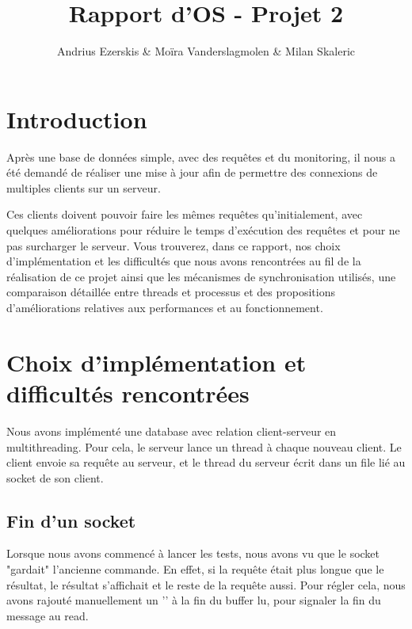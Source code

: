 \documentclass[utf8]{article}
\begin{document}
\begin{titlepage}


\author{Andrius Ezerskis \& Moïra Vanderslagmolen \& Milan Skaleric}
\title{Rapport d'OS - Projet 2}

\maketitle
\end{titlepage}
\begin{large}

\section{Introduction}
\par
\indent

Après une base de données simple, avec des requêtes et du monitoring, il nous a
été demandé de réaliser une mise à jour afin de permettre des connexions de
multiples clients sur un serveur.

\par
\par

Ces clients doivent pouvoir faire les mêmes requêtes qu'initialement, avec
quelques améliorations pour réduire le temps d'exécution des requêtes et pour ne
pas surcharger le serveur. Vous trouverez, dans ce rapport, nos choix
d'implémentation et les difficultés que nous avons rencontrées au fil de la
réalisation de ce projet ainsi que les mécanismes de synchronisation utilisés,
une comparaison détaillée entre threads et processus et des propositions
d'améliorations relatives aux performances et au fonctionnement.

\par
\section{Choix d'implémentation et difficultés rencontrées}
Nous avons implémenté une database avec relation client-serveur en
multithreading. Pour cela, le serveur lance un thread à chaque nouveau client.
Le client envoie sa requête au serveur, et le thread du serveur écrit dans un file lié au
socket de son client.   
\subsection{Fin d'un socket}
\par
\indent

Lorsque nous avons commencé à lancer les tests, nous avons vu que le socket
"gardait" l'ancienne commande. En effet, si la requête était plus longue que le
résultat, le résultat s'affichait et le reste de la requête aussi. Pour régler
cela, nous avons rajouté manuellement un '' à la fin du buffer lu, pour
signaler la fin du message au read.   


\end{large}
\end{document}
